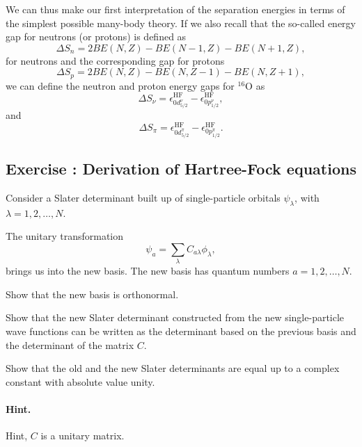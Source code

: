 \documentclass[graybox,sectrefs,envcountresetchap,open=right]{svmonodo}
\newenvironment{doconceexercise}{}{}
\newcounter{doconceexercisecounter}
\begin{document}
We can thus make our first interpretation of the separation energies in terms of the simplest
possible many-body theory. 
If we also recall that the so-called energy gap for neutrons (or protons) is defined as
\[
\Delta S_n= 2BE(N,Z)-BE(N-1,Z)-BE(N+1,Z),
\]
for neutrons and the corresponding gap for protons
\[
\Delta S_p= 2BE(N,Z)-BE(N,Z-1)-BE(N,Z+1),
\]
we can define the neutron and proton energy gaps for ${}^{16}\mbox{O}$ as
\[
\Delta S_{\nu}=\epsilon_{0d^{\nu}_{5/2}}^{\mathrm{HF}}-\epsilon_{0p^{\nu}_{1/2}}^{\mathrm{HF}}, 
\]
and 
\[
\Delta S_{\pi}=\epsilon_{0d^{\pi}_{5/2}}^{\mathrm{HF}}-\epsilon_{0p^{\pi}_{1/2}}^{\mathrm{HF}}. 
\]






\begin{doconceexercise}

\subsection*{Exercise \thedoconceexercisecounter: Derivation of Hartree-Fock equations}


Consider a Slater determinant built up of single-particle orbitals $\psi_{\lambda}$, 
with $\lambda = 1,2,\dots,N$.

The unitary transformation
\[
\psi_a  = \sum_{\lambda} C_{a\lambda}\phi_{\lambda},
\]
brings us into the new basis.  
The new basis has quantum numbers $a=1,2,\dots,N$.


Show that the new basis is orthonormal.

Show that the new Slater determinant constructed from the new single-particle wave functions can be
written as the determinant based on the previous basis and the determinant of the matrix $C$.

Show that the old and the new Slater determinants are equal up to a complex constant with absolute value unity.


\paragraph{Hint.}
Hint, $C$ is a unitary matrix.




\end{doconceexercise}
\end{document}
